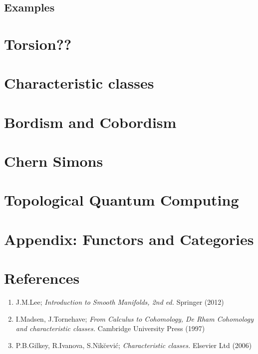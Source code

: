 \documentclass[a4paper]{article}
\theoremstyle{definition} \newtheorem*{definition}{Definition}
\theoremstyle{definition} \newtheorem*{definitions}{Definitions}
\theoremstyle{plain} \newtheorem{theorem}{Theorem}[section]
\theoremstyle{plain} \newtheorem{proposition}[theorem]{Proposition}
\theoremstyle{plain} \newtheorem{corollary}[theorem]{Corollary}
\theoremstyle{plain} \newtheorem{lemma}[theorem]{Lemma}
\theoremstyle{plain} \newtheorem{example}[theorem]{Example}
\begin{document}
\subsection{Examples}

\section{Torsion??}

\section{Characteristic classes}

\section{Bordism and Cobordism}

\section{Chern Simons}

\section{Topological Quantum Computing}

\section{Appendix: Functors and Categories}

\section*{References}
\begin{enumerate}
\item J.M.Lee; \textit{Introduction to Smooth Manifolds, 2nd ed.} Springer (2012)
\item I.Madsen, J.Tornehave; \textit{From Calculus to Cohomology, De Rham Cohomology and characteristic classes.} Cambridge University Press (1997)
\item P.B.Gilkey, R.Ivanova, S.Nik{\u c}evi\'c; \textit{Characteristic classes.} Elsevier Ltd (2006)
\end{enumerate}
\end{document}
